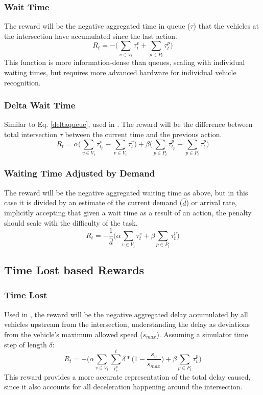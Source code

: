 \documentclass[conference]{IEEEtran}
\begin{document}
\subsubsection{Wait Time}
The reward will be the negative aggregated time in queue ($\tau$) that the vehicles at the intersection have accumulated since the last action. 
\begin{equation}
R_t = - \bigg( \sum_{v \in V_t} \tau^v_{t} + \sum_{p \in P_t} \tau^p_{t} \bigg)
\label{eq:wait_time}
\end{equation}
This function is more information-dense than queues, scaling with individual waiting times, but requires more advanced hardware for individual vehicle recognition.

\subsubsection{Delta Wait Time}
Similar to Eq. \ref{deltaqueue}, used in \cite{liang2018}. The reward will be the difference between total intersection $\tau$ between the current time and the previous action. 
\begin{equation}
R_t = \alpha \bigg( \sum_{v \in V_t} \tau^v_{t_p} -  \sum_{v \in V_t} \tau^v_{t} \bigg) + \beta \bigg( \sum_{p \in P_t} \tau^p_{t_p} -  \sum_{p \in P_t} \tau^p_{t} \bigg)
\label{eq:delta_wait_time}
\end{equation}

\subsubsection{Waiting Time Adjusted by Demand}
The reward will be the negative aggregated waiting time as above, but in this case it is divided by an estimate of the current demand ($\hat{d}$) or arrival rate, implicitly accepting that given a wait time as a result of an action, the penalty should scale with the difficulty of the task.
\begin{equation}
   R_t = -\frac{1}{\hat{d}} \bigg( \alpha \sum_{v \in V_t} \tau^v_{t} + \beta \sum_{p \in P_t} \tau^p_{t} \bigg)
\label{eq:wait_time_norm} 
\end{equation}

\subsection{Time Lost based Rewards}
\subsubsection{Time Lost}
Used in \cite{wan2018}, the reward will be the negative aggregated delay accumulated by all vehicles upstream from the intersection, understanding the delay as deviations from the vehicle's maximum allowed speed ($s_{max}$). 
Assuming a simulator time step of length $\delta$:
\begin{equation}
    R_t = - \bigg( \alpha \sum_{v \in V_t}  \sum_{t^p_e}^t \delta * \big( 1-\frac{s_v}{s_{max}} \big) + \beta \sum_{p \in P_t} \tau^p_t \bigg)
\label{eq:delay}
\end{equation}
This reward provides a more accurate representation of the total delay caused, since it also accounts for all deceleration happening around the intersection. 
\end{document}
